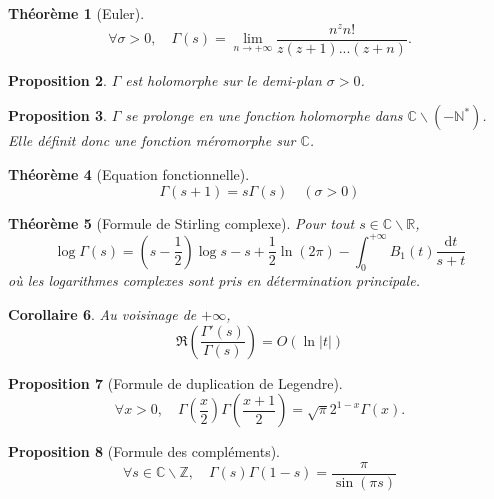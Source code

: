 \documentclass[french]{report}
\newtheorem{theorem}{Théorème}[section]
\newtheorem{proposition}[theorem]{Proposition}
\newtheorem{corollary}[theorem]{Corollaire}
\begin{document}
\begin{theorem}[Euler]
  \[
    \forall \sigma>0,\quad
    \Gamma(s)=\lim_{n\to+\infty}\frac{n^zn!}{z(z+1)...(z+n)}.  
  \]
\end{theorem}

\begin{proposition}
  $\Gamma$ est holomorphe sur le demi-plan $\sigma>0$.
\end{proposition}

\begin{proposition}
  $\Gamma$ se prolonge en une fonction holomorphe dans $\mathbb{C}\backslash(-\mathbb{N}^*)$. Elle définit donc une fonction méromorphe sur $\mathbb{C}$.
\end{proposition}

\begin{theorem}[Equation fonctionnelle]\label{thm:gamma-equation-fonctionnelle}
  \[
    \Gamma(s+1)=s\Gamma(s)\quad(\sigma>0)
  \]
\end{theorem}

\begin{theorem}[Formule de Stirling complexe]\label{thm:stirling-complexe}
  Pour tout $s\in\mathbb{C}\backslash\mathbb{R}$,
  \[
    \log\Gamma(s)
    = (s-\frac{1}{2})\log s
    - s
    + \frac{1}{2}\ln(2\pi)
    - \int_0^{+\infty} B_1(t)\frac{\mathrm{d}t}{s+t}
  \]
  où les logarithmes complexes sont pris en détermination principale.
\end{theorem}

\begin{corollary}\label{cor:gamma-gamma-prime-majoration}
  Au voisinage de $+\infty$,
  \[
    \Re\left(\frac{\Gamma'(s)}{\Gamma(s)}\right) = O(\ln|t|)
  \]
\end{corollary}

\begin{proposition}[Formule de duplication de Legendre]\label{prop:gamma-duplication-legendre}
  \[
    \forall x>0,\quad
    \Gamma\left(\frac{x}{2}\right)\Gamma\left(\frac{x+1}{2}\right)
    =\sqrt{\pi}2^{1-x}\Gamma(x).
  \]
\end{proposition}

\begin{proposition}[Formule des compléments]\label{prop:gamma-formule-complements}
  \[
    \forall s\in\mathbb{C}\backslash\mathbb{Z},\quad
    \Gamma(s)\Gamma(1-s)=\frac{\pi}{\sin(\pi s)}
  \]
\end{proposition}

\end{document}
